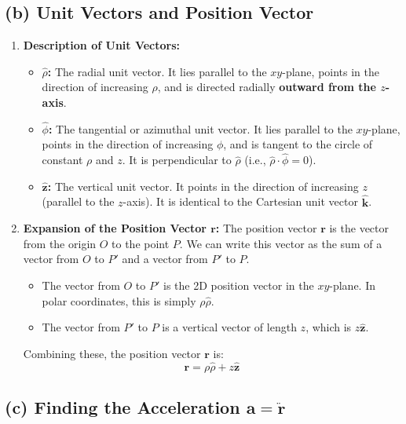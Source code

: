 \documentclass[11pt, a4paper]{article} %
\begin{document}
\hrulefill

\subsection*{(b) Unit Vectors and Position Vector}

\begin{enumerate}
    \item \textbf{Description of Unit Vectors:}
    \begin{itemize}
        \item \textbf{$\hat{\rho}$:} The radial unit vector. It lies parallel to the $xy$-plane, points in the direction of increasing $\rho$, and is directed radially \textbf{outward from the $z$-axis}.
        \item \textbf{$\hat{\phi}$:} The tangential or azimuthal unit vector. It lies parallel to the $xy$-plane, points in the direction of increasing $\phi$, and is tangent to the circle of constant $\rho$ and $z$. It is perpendicular to $\hat{\rho}$ (i.e., $\hat{\rho} \cdot \hat{\phi} = 0$).
        \item \textbf{$\hat{\mathbf{z}}$:} The vertical unit vector. It points in the direction of increasing $z$ (parallel to the $z$-axis). It is identical to the Cartesian unit vector $\hat{\mathbf{k}}$.
    \end{itemize}

    \item \textbf{Expansion of the Position Vector $\mathbf{r}$:}
    The position vector $\mathbf{r}$ is the vector from the origin $O$ to the point $P$. We can write this vector as the sum of a vector from $O$ to $P'$ and a vector from $P'$ to $P$.
    \begin{itemize}
        \item The vector from $O$ to $P'$ is the 2D position vector in the $xy$-plane. In polar coordinates, this is simply $\rho \hat{\rho}$.
        \item The vector from $P'$ to $P$ is a vertical vector of length $z$, which is $z \hat{\mathbf{z}}$.
    \end{itemize}
    
    Combining these, the position vector $\mathbf{r}$ is:
    $$\mathbf{r} = \rho \hat{\rho} + z \hat{\mathbf{z}}$$
\end{enumerate}

\hrulefill

\subsection*{(c) Finding the Acceleration $\mathbf{a} = \ddot{\mathbf{r}}$}
\end{document}
